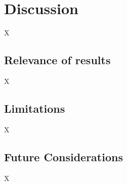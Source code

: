 \documentclass[11pt]{article}
\begin{document}
\setcounter{section}{4} %

\section{Discussion}

X

\subsection{Relevance of results}

X

\subsection{Limitations}

X

\subsection{Future Considerations}

X
\end{document}
